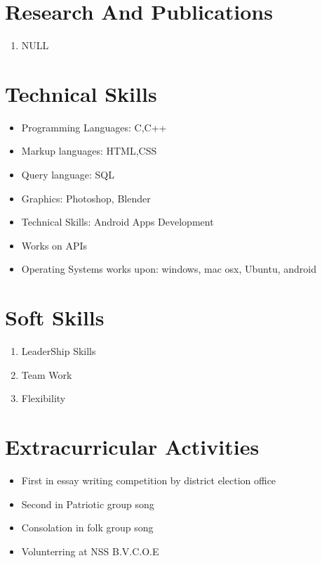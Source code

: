\documentclass{article}
\begin{document}
	\section{Research And Publications}
		\begin{enumerate}
			\item {NULL}
		\end{enumerate}
	\section{Technical Skills}
		\begin{itemize}
			\item {Programming Languages: C,C++}
			\item {Markup languages: HTML,CSS}
			\item {Query language: SQL}
			\item {Graphics: Photoshop, Blender}
			\item {Technical Skills: Android Apps Development}
			\item {Works on APIs}
			\item {Operating Systems works upon: windows, mac osx, Ubuntu, android}
		\end{itemize}
	\section{Soft Skills}
		\begin{enumerate}
			\item {LeaderShip Skills}
			\item {Team Work}
			\item {Flexibility}
		\end{enumerate}
	\section{Extracurricular Activities}
		\begin{itemize}
			\item { First in essay writing competition by district election office }
			\item { Second in Patriotic group song}
			\item { Consolation in folk group song}
			\item { Volunterring at NSS B.V.C.O.E}
		\end{itemize}
\end{document}
